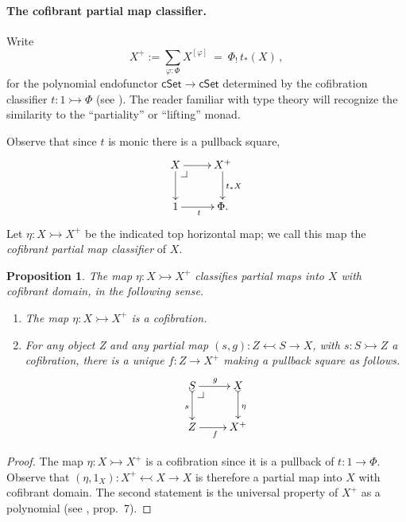 \documentclass[12pt]{article}
\makeatletter
\newcommand{\cSet}{\ensuremath{\mathsf{cSet}}}
\newcommand{\mono}{\ensuremath{\rightarrowtail}}
\newcommand{\ra}{\ensuremath{\rightarrow}}
\newcommand{\too}{\ensuremath{\longrightarrow}}
\newtheorem{proposition}[theorem]{Proposition}
\theoremstyle{remark}
\theoremstyle{definition}
\newcommand{\pbcorner}[1][dr]{\save*!/#1-1.2pc/#1:(-1,1)@^{|-}\restore}
\makeatother
\begin{document}
\paragraph{The cofibrant partial map classifier.}
Write 
\begin{equation}\label{eq:partialmapclassifier}
X^+ := \sum_{\varphi: \Phi}X^{[\varphi]}\ =\ \Phi_!\,t_*(X)\,,
\end{equation}
for the polynomial endofunctor $\cSet\too \cSet$ determined by the cofibration classifier $t : 1 \mono \Phi$ (see  \cite{GK}).  The reader familiar with type theory will recognize the  similarity to the ``partiality'' or ``lifting''  monad.  

Observe that since $t$ is monic there is a pullback square,
\[
\xymatrix{
X \ar[d]\pbcorner \ar[r] & X^+ \ar[d]^{t_*X}\\
1 \ar[r]_{t} & \Phi.
}
\]
Let $\eta : X\mono X^+$ be the indicated top horizontal map; we call this map the \emph{cofibrant partial map classifier} of $X$.
 
\begin{proposition}\label{prop:cofparclass}
The map $\eta : X\mono X^+$ classifies partial maps into $X$ with cofibrant domain, in the following sense.
\begin{enumerate}
\item The map $\eta : X\mono X^+$ is a cofibration.
\item For any object Z and any partial map $(s,g): Z\leftarrowtail S\ra X$, with $s : S\mono Z$ a cofibration, there is a unique $f:Z\ra X^+$ making a pullback square as follows.
\[
\xymatrix{
S \ar@{>->}[d]_{s} \pbcorner \ar[r]^g & X \ar@{>->}[d]^{\eta}\\
Z \ar[r]_f & X^+
}
\]
\end{enumerate}
\end{proposition}

\begin{proof}
The map $\eta : X\mono X^+$ is a cofibration since it is a pullback of $t : 1\ra \Phi$. Observe that $(\eta, 1_X) : X^+\leftarrowtail X\ra X$ is therefore a partial map into $X$ with cofibrant domain. The second statement is the universal property of $X^+$ as a polynomial (see \cite{AN}, prop.~7). 
\end{proof}

\end{document}
